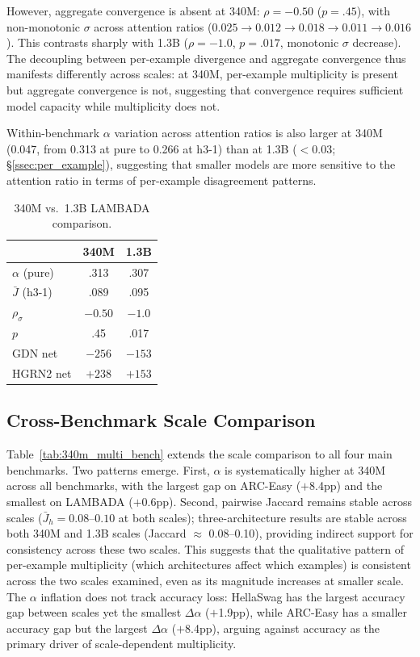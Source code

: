 However, aggregate convergence is absent at 340M: $\rho = -0.50$ ($p = .45$), with non-monotonic $\sigma$ across attention ratios ($0.025 \to 0.012 \to 0.018 \to 0.011 \to 0.016$). This contrasts sharply with 1.3B ($\rho = -1.0$, $p = .017$, monotonic $\sigma$ decrease). The decoupling between per-example divergence and aggregate convergence thus manifests differently across scales: at 340M, per-example multiplicity is present but aggregate convergence is not, suggesting that convergence requires sufficient model capacity while multiplicity does not.

Within-benchmark $\alpha$ variation across attention ratios is also larger at 340M (0.047, from 0.313 at pure to 0.266 at h3-1) than at 1.3B ($< 0.03$; \S\ref{ssec:per_example}), suggesting that smaller models are more sensitive to the attention ratio in terms of per-example disagreement patterns.

\begin{table}[ht]
\centering
\small
\caption{340M vs.\ 1.3B LAMBADA comparison.}
\label{tab:scale_comparison}
\begin{tabular}{@{}lcc@{}}
\toprule
 & 340M & 1.3B \\
\midrule
$\alpha$ (pure) & .313 & .307 \\
$\bar{J}$ (h3-1) & .089 & .095 \\
$\rho_\sigma$ & $-0.50$ & $-1.0$ \\
$p$ & .45 & .017 \\
GDN net & $-256$ & $-153$ \\
HGRN2 net & $+238$ & $+153$ \\
\bottomrule
\end{tabular}
\end{table}

\subsection{Cross-Benchmark Scale Comparison}

Table~\ref{tab:340m_multi_bench} extends the scale comparison to all four main benchmarks. Two patterns emerge. First, $\alpha$ is systematically higher at 340M across all benchmarks, with the largest gap on ARC-Easy ($+$8.4pp) and the smallest on LAMBADA ($+$0.6pp). Second, pairwise Jaccard remains stable across scales ($\bar{J}_h = 0.08$--$0.10$ at both scales); three-architecture results are stable across both 340M and 1.3B scales (Jaccard $\approx$ 0.08--0.10), providing indirect support for consistency across these two scales. This suggests that the qualitative pattern of per-example multiplicity (which architectures affect which examples) is consistent across the two scales examined, even as its magnitude increases at smaller scale. The $\alpha$ inflation does not track accuracy loss: HellaSwag has the largest accuracy gap between scales yet the smallest $\Delta\alpha$ ($+$1.9pp), while ARC-Easy has a smaller accuracy gap but the largest $\Delta\alpha$ ($+$8.4pp), arguing against accuracy as the primary driver of scale-dependent multiplicity.

